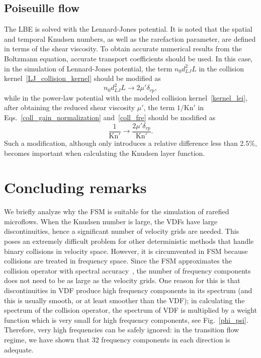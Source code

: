 \subsection{Poiseuille flow}

The LBE is solved with the Lennard-Jones potential. It is noted that the spatial and temporal Knudsen numbers, as well as the rarefaction parameter, are defined in terms of the shear viscosity. To obtain accurate numerical results from the Boltzmann equation, accurate transport coefficients should be used. In this case, in the simulation of Lennard-Jones potential, the term $n_0d_{LJ}^2L$ in the collision kernel~\eqref{LJ_collision_kernel} should be modified as
\begin{equation}
n_0d_{LJ}^2L \rightarrow 
2\mu'\delta_{rp}, %
\end{equation}
while in the power-law potential with the modeled collision kernel~\eqref{kernel_lei}, after obtaining the reduced shear viscosity $\mu'$, the term $1/\text{Kn}'$ in Eqs.~\eqref{coll_gain_normalization} and~\eqref{coll_fre} should be modified as
\begin{equation}
\frac{1}{\text{Kn}'}\rightarrow
\frac{2\mu'\delta_{rp}}{\text{Kn}'}.
\end{equation}
Such a modification, although only introduces a relative difference less than 2.5\%, becomes important when calculating the Knudsen layer function. 




\section{Concluding remarks}



We briefly analyze why the FSM is suitable for the simulation of rarefied microflows. When the Knudsen number is large, the VDFs have large discontinuities, hence a significant number of velocity grids are needed. This poses an extremely difficult problem for other deterministic methods that handle binary collisions in velocity space. However, it is circumvented in FSM because collisions are treated in frequency space. Since the FSM approximates the collision operator with spectral accuracy~\citep{Mouhot2006}, the number of frequency components does not need to be as large as the velocity grids. One reason for this is that discontinuities in VDF produce high frequency components in its spectrum (and this is usually smooth, or at least smoother than the VDF); in calculating the spectrum of the collision operator, the spectrum of VDF is multiplied by a weight function which is very small for high frequency components, see Fig.~\ref{phi_psi}. Therefore, very high frequencies can be safely ignored: in the transition flow regime, we have shown that $32$ frequency components in each direction is adequate. 



